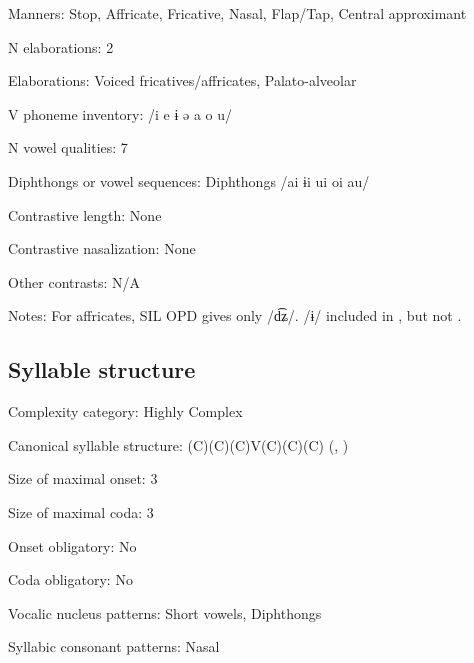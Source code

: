 {\begin{appendixdesc}
\item[Manners:] Stop, Affricate, Fricative, Nasal, Flap/Tap, Central approximant

\item[N elaborations:] 2

\item[Elaborations:] Voiced fricatives/affricates, Palato-alveolar

\item[V phoneme inventory:] /i e ɨ ə a o u/

\item[N vowel qualities:] 7

\item[Diphthongs or vowel sequences:] Diphthongs /ai ɨi ui oi au/

\item[Contrastive length:] None

\item[Contrastive nasalization:] None

\item[Other contrasts:] N/A

\item[Notes:] For affricates, SIL OPD gives only /d͡ʑ/. /ɨ/ included in \citet{Bruce1984}, but not \citet{EdmistonEdmiston2003}.
\end{appendixdesc}
\subsection*{Syllable structure}
\begin{appendixdesc}

\item[Complexity category:] Highly Complex

\item[Canonical syllable structure:] (C)(C)(C)V(C)(C)(C) (\citealt{Bruce1984}, \citealt{EdmistonEdmiston2003})

\item[Size of maximal onset:] 3

\item[Size of maximal coda:] 3

\item[Onset obligatory:] No

\item[Coda obligatory:] No

\item[Vocalic nucleus patterns:] Short vowels, Diphthongs

\item[Syllabic consonant patterns:] Nasal


\end{appendixdesc}}
